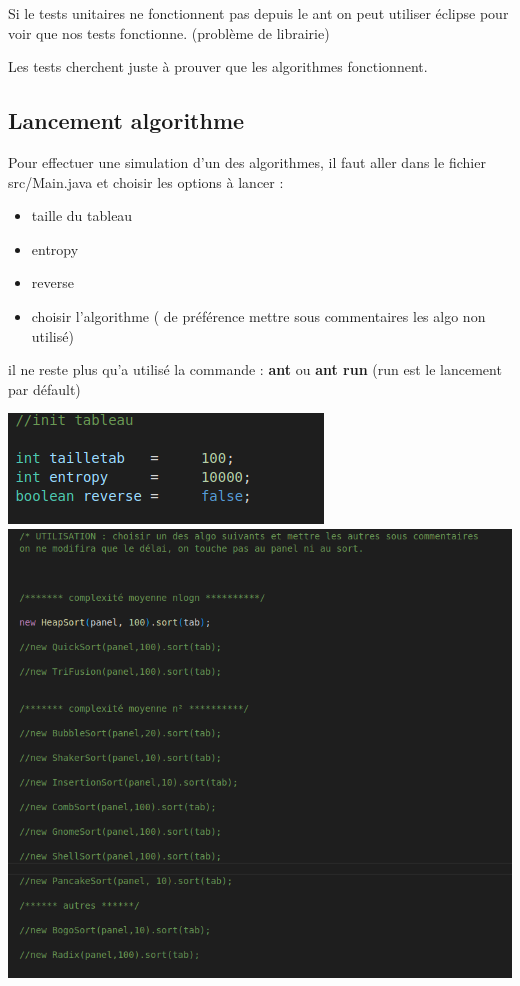 \documentclass{article}
\begin{document}
Si le tests unitaires ne fonctionnent pas depuis le ant on peut utiliser éclipse pour voir que nos tests fonctionne. (problème de librairie) 

Les tests cherchent juste à prouver que les algorithmes fonctionnent.

\subsection{Lancement algorithme}

Pour effectuer une simulation d'un des algorithmes, il faut aller dans le fichier src/Main.java et choisir 
les options à lancer : 

\begin{itemize}
    \item taille du tableau 
    \item entropy 
    \item reverse 
    \item choisir l'algorithme ( de préférence mettre sous commentaires les algo non utilisé)
\end{itemize}

il ne reste plus qu'a utilisé la commande : \textbf{ant} ou \textbf{ant run} (run est le lancement par défault) 

\vspace{1cm}

\includegraphics[scale=0.4]{Annexes/init tab.png}
\newline
\includegraphics[scale=0.4]{Annexes/choix algo.png}
\end{document}
